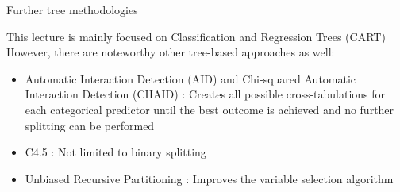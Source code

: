 \documentclass[11pt,compress,t,notes=noshow, xcolor=table]{beamer}
\begin{document}
\begin{framev}{Further tree methodologies}

This lecture is mainly focused on Classification and Regression Trees (CART)  \\
However, there are noteworthy other tree-based approaches as well:

\begin{itemize}
\item Automatic Interaction Detection (AID)  and Chi-squared Automatic Interaction Detection (CHAID) : Creates all possible cross-tabulations for each categorical predictor until the best outcome is achieved and no further splitting can be performed
\item C4.5 : Not limited to binary splitting
\item Unbiased Recursive Partitioning : Improves the variable selection algorithm
\end{itemize}

\end{framev}

\endlecture
\end{document}
